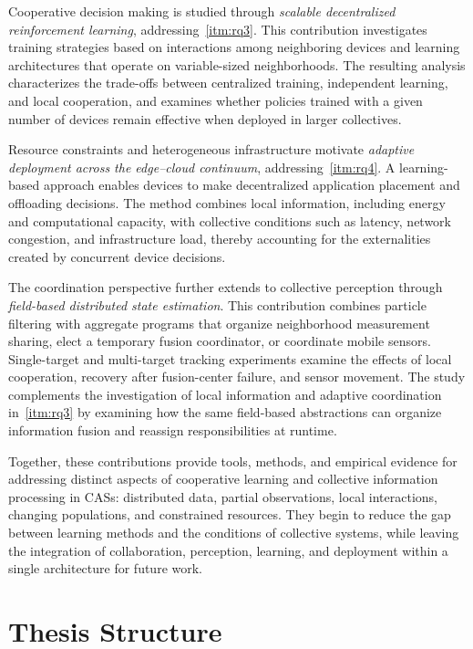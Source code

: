 Cooperative decision making is studied through
 \emph{scalable decentralized reinforcement learning},
 addressing~\ref{itm:rq3}.
%
This contribution investigates training strategies based on interactions among neighboring devices
 and learning architectures that operate on variable-sized neighborhoods.
%
The resulting analysis characterizes the trade-offs between centralized training,
 independent learning, and local cooperation, and examines whether policies trained
 with a given number of devices remain effective when deployed in larger collectives.

Resource constraints and heterogeneous infrastructure motivate
 \emph{adaptive deployment across the edge--cloud continuum},
 addressing~\ref{itm:rq4}.
%
A learning-based approach enables devices to make decentralized application placement
 and offloading decisions.
%
The method combines local information, including energy and computational capacity,
 with collective conditions such as latency, network congestion, and infrastructure load,
 thereby accounting for the externalities created by concurrent device decisions.

The coordination perspective further extends to collective perception through
 \emph{field-based distributed state estimation}.
%
This contribution combines particle filtering with aggregate programs
 that organize neighborhood measurement sharing,
 elect a temporary fusion coordinator, or coordinate mobile sensors.
%
Single-target and multi-target tracking experiments examine the effects of local cooperation,
 recovery after fusion-center failure, and sensor movement.
%
The study complements the investigation of local information
 and adaptive coordination in~\ref{itm:rq3} by examining how the same field-based abstractions
 can organize information fusion and reassign responsibilities at runtime.

Together,
 these contributions provide tools, methods, and empirical evidence for
 addressing distinct aspects of cooperative learning and collective information
 processing in \glspl{CAS}: distributed data, partial observations, local interactions,
 changing populations, and constrained resources.
%
They begin to reduce the gap between learning methods and the conditions of
 collective systems, while leaving the integration of collaboration,
 perception, learning, and deployment within a single architecture for future work.

\section{Thesis Structure}

